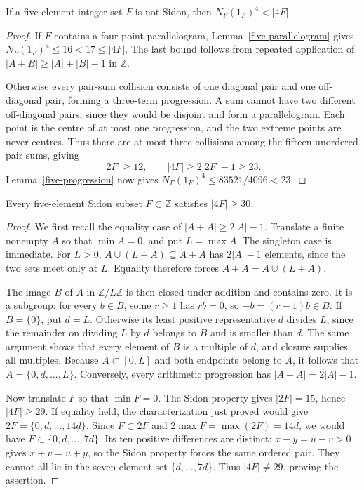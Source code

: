 \begin{proposition}\label{five-nonsidon}
If a five-element integer set $F$ is not Sidon, then
$N_F(1_F)^4<|4F|$.
\end{proposition}
\begin{proof}
If $F$ contains a four-point parallelogram, Lemma~\ref{five-parallelogram}
gives $N_F(1_F)^4\le16<17\le|4F|$. The last bound follows from
repeated application of $|A+B|\ge|A|+|B|-1$ in $\mathbb Z$.

Otherwise every pair-sum collision consists of one diagonal pair and one
off-diagonal pair, forming a three-term progression. A sum cannot have two
different off-diagonal pairs, since they would be disjoint and form a
parallelogram. Each point is the centre of at most one progression, and
the two extreme points are never centres. Thus there are at most three
collisions among the fifteen unordered pair sums, giving
\[
 |2F|\ge12,\qquad |4F|\ge2|2F|-1\ge23.
\]
Lemma~\ref{five-progression} now gives
$N_F(1_F)^4\le83521/4096<23$.
\end{proof}

\begin{lemma}\label{lem:elementary-sidon30}
Every five-element Sidon subset $F\subset\mathbb Z$ satisfies
$|4F|\ge30$.
\end{lemma}
\begin{proof}
We first recall the equality case of $|A+A|\ge2|A|-1$.
Translate a finite nonempty $A$ so that $\min A=0$, and put $L=\max A$.
The singleton case is immediate. For $L>0$,
$A\cup(L+A)\subseteq A+A$ has $2|A|-1$ elements, since the two
sets meet only at $L$. Equality therefore forces
$A+A=A\cup(L+A)$.

The image $B$ of $A$ in $\mathbb Z/L\mathbb Z$ is then closed under
addition and contains zero. It is a subgroup: for every $b\in B$,
some $r\ge1$ has $rb=0$, so $-b=(r-1)b\in B$.
If $B=\{0\}$, put $d=L$. Otherwise its least positive representative
$d$ divides $L$, since the remainder on dividing $L$ by $d$ belongs
to $B$ and is smaller than $d$. The same argument shows that every
element of $B$ is a multiple of $d$, and closure supplies all multiples.
Because $A\subset[0,L]$ and both endpoints belong to $A$, it follows that
$A=\{0,d,\ldots,L\}$. Conversely, every arithmetic progression has
$|A+A|=2|A|-1$.

Now translate $F$ so that $\min F=0$. The Sidon property gives
$|2F|=15$, hence $|4F|\ge29$. If equality held, the characterization
just proved would give $2F=\{0,d,\ldots,14d\}$. Since $F\subset2F$
and $2\max F=\max(2F)=14d$, we would have
$F\subset\{0,d,\ldots,7d\}$. Its ten positive differences are distinct:
$x-y=u-v>0$ gives $x+v=u+y$, so the Sidon property forces the same
ordered pair. They cannot all lie in the seven-element set
$\{d,\ldots,7d\}$. Thus $|4F|\ne29$, proving the assertion.
\end{proof}

